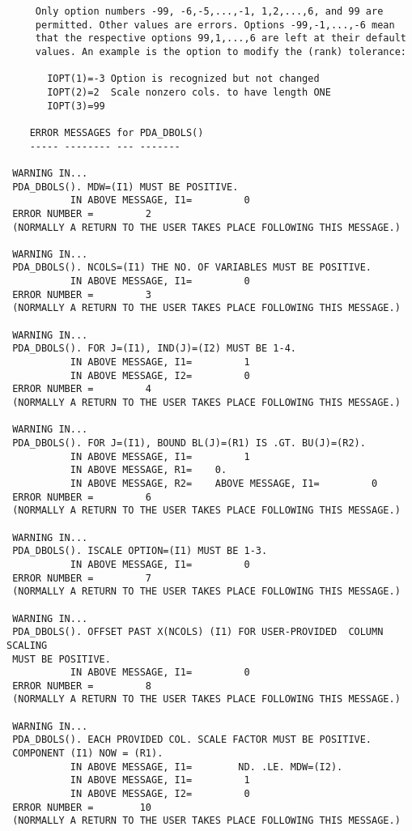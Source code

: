 \begin{verbatim}
     Only option numbers -99, -6,-5,...,-1, 1,2,...,6, and 99 are
     permitted. Other values are errors. Options -99,-1,...,-6 mean
     that the respective options 99,1,...,6 are left at their default
     values. An example is the option to modify the (rank) tolerance:

       IOPT(1)=-3 Option is recognized but not changed
       IOPT(2)=2  Scale nonzero cols. to have length ONE
       IOPT(3)=99

    ERROR MESSAGES for PDA_DBOLS()
    ----- -------- --- -------

 WARNING IN...
 PDA_DBOLS(). MDW=(I1) MUST BE POSITIVE.
           IN ABOVE MESSAGE, I1=         0
 ERROR NUMBER =         2
 (NORMALLY A RETURN TO THE USER TAKES PLACE FOLLOWING THIS MESSAGE.)

 WARNING IN...
 PDA_DBOLS(). NCOLS=(I1) THE NO. OF VARIABLES MUST BE POSITIVE.
           IN ABOVE MESSAGE, I1=         0
 ERROR NUMBER =         3
 (NORMALLY A RETURN TO THE USER TAKES PLACE FOLLOWING THIS MESSAGE.)

 WARNING IN...
 PDA_DBOLS(). FOR J=(I1), IND(J)=(I2) MUST BE 1-4.
           IN ABOVE MESSAGE, I1=         1
           IN ABOVE MESSAGE, I2=         0
 ERROR NUMBER =         4
 (NORMALLY A RETURN TO THE USER TAKES PLACE FOLLOWING THIS MESSAGE.)

 WARNING IN...
 PDA_DBOLS(). FOR J=(I1), BOUND BL(J)=(R1) IS .GT. BU(J)=(R2).
           IN ABOVE MESSAGE, I1=         1
           IN ABOVE MESSAGE, R1=    0.
           IN ABOVE MESSAGE, R2=    ABOVE MESSAGE, I1=         0
 ERROR NUMBER =         6
 (NORMALLY A RETURN TO THE USER TAKES PLACE FOLLOWING THIS MESSAGE.)

 WARNING IN...
 PDA_DBOLS(). ISCALE OPTION=(I1) MUST BE 1-3.
           IN ABOVE MESSAGE, I1=         0
 ERROR NUMBER =         7
 (NORMALLY A RETURN TO THE USER TAKES PLACE FOLLOWING THIS MESSAGE.)

 WARNING IN...
 PDA_DBOLS(). OFFSET PAST X(NCOLS) (I1) FOR USER-PROVIDED  COLUMN SCALING
 MUST BE POSITIVE.
           IN ABOVE MESSAGE, I1=         0
 ERROR NUMBER =         8
 (NORMALLY A RETURN TO THE USER TAKES PLACE FOLLOWING THIS MESSAGE.)

 WARNING IN...
 PDA_DBOLS(). EACH PROVIDED COL. SCALE FACTOR MUST BE POSITIVE.
 COMPONENT (I1) NOW = (R1).
           IN ABOVE MESSAGE, I1=        ND. .LE. MDW=(I2).
           IN ABOVE MESSAGE, I1=         1
           IN ABOVE MESSAGE, I2=         0
 ERROR NUMBER =        10
 (NORMALLY A RETURN TO THE USER TAKES PLACE FOLLOWING THIS MESSAGE.)


\end{verbatim}
